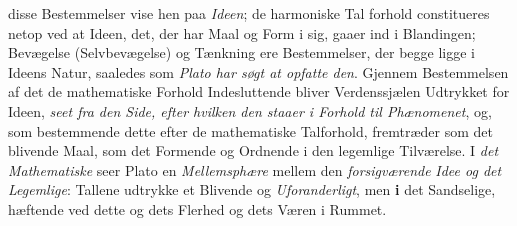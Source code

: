 disse Bestemmelser vise hen paa \emph{Ideen}; de harmoniske Tal\-%
forhold constitueres netop ved at Ideen, det, der har Maal og
Form i sig, gaaer ind i Blandingen; Bevægelse (Selvbevægelse)
og Tænkning ere Bestemmelser, der begge ligge i Ideens
Natur, saaledes som \emph{Plato har søgt at opfatte den}. Gjennem
Bestemmelsen af det de mathematiske Forhold Indesluttende
bliver Verdenssjælen Udtrykket for Ideen, \emph{seet fra den Side,
efter hvilken den staaer i Forhold til Phænomenet},
og, som bestemmende dette efter de mathematiske Talforhold,
fremtræder som det blivende Maal, som det Formende og
Ordnende i den legemlige Tilværelse. I \emph{det Mathematiske}
seer Plato en \emph{Mellemsphære} mellem den \emph{forsigværende}
\emph{Idee og det Legemlige}: Tallene udtrykke et Blivende og
\emph{Uforanderligt}, men \textbf{i} det Sandselige, hæftende ved dette og
dets Flerhed og dets Væren i Rummet.

